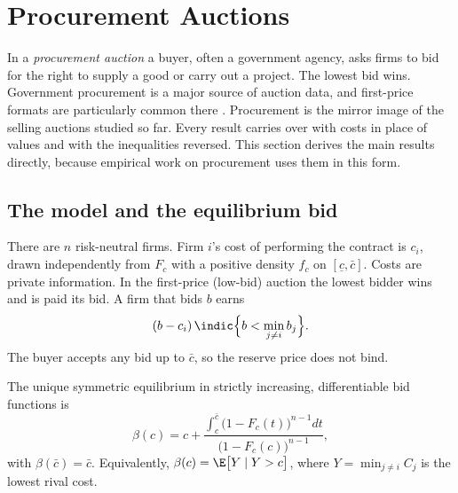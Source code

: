 \section{Procurement Auctions}\label{sec:14-procurement}

In a \emph{procurement auction} a buyer, often a government agency, asks firms to bid for the right
to supply a good or carry out a project. The lowest bid wins. Government procurement is a major source
of auction data, and first-price formats are particularly common there \citep[Section
1]{AtheyHaile2007}. Procurement is the mirror image of the selling auctions studied so far. Every
result carries over with costs in place of values and with the inequalities reversed. This section
derives the main results directly, because empirical work on procurement uses them in this form.

\subsection{The model and the equilibrium bid}\label{sec:14-proc-model}

There are $n$ risk-neutral firms. Firm $i$'s cost of performing the contract is $c_i$, drawn
independently from $F_c$ with a positive density $f_c$ on $[\underline c,\bar c]$. Costs are private
information. In the first-price (low-bid) auction the lowest bidder wins and is paid its bid. A firm
that bids $b$ earns
\begin{equation}\label{eq:14-proc-payoff}
(b-c_i)\,\indic\Bigl\{b<\min_{j\neq i}b_j\Bigr\}.
\end{equation}
The buyer accepts any bid up to $\bar c$, so the reserve price does not bind.

\begin{proposition}\label{prop:14-proc-bid}
The unique symmetric equilibrium in strictly increasing, differentiable bid functions is
\begin{equation}\label{eq:14-proc-bid}
\beta(c)=c+\frac{\int_c^{\bar c}\bigl(1-F_c(t)\bigr)^{n-1}dt}{\bigl(1-F_c(c)\bigr)^{n-1}},
\end{equation}
with $\beta(\bar c)=\bar c$. Equivalently, $\beta(c)=\E\bigl[Y\mid Y>c\bigr]$, where
$Y=\min_{j\neq i}C_j$ is the lowest rival cost.
\end{proposition}

